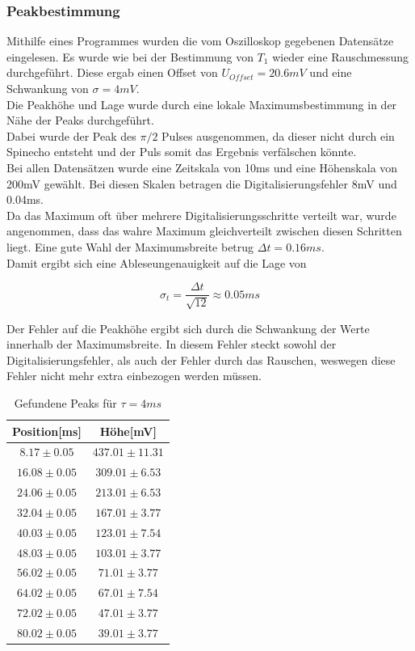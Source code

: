 \documentclass[12pt,a4paper]{article}
\begin{document}
\subsubsection{Peakbestimmung}
Mithilfe eines Programmes wurden die vom Oszilloskop gegebenen Datensätze eingelesen.
Es wurde wie bei der Bestimmung von $T_1$ wieder eine Rauschmessung durchgeführt.
Diese ergab einen Offset von $U_{Offset} = 20.6mV$ und eine Schwankung von $\sigma = 4mV$.\\
Die Peakhöhe und Lage wurde durch eine lokale Maximumsbestimmung in der Nähe der Peaks durchgeführt.\\
Dabei wurde der Peak des $\pi/2$ Pulses ausgenommen, da dieser nicht durch ein Spinecho entsteht und der Puls somit das Ergebnis verfälschen könnte.\\
Bei allen Datensätzen wurde eine Zeitskala von 10ms und eine Höhenskala von 200mV gewählt. Bei diesen Skalen betragen die Digitalisierungsfehler 8mV und 0.04ms.\\
Da das Maximum oft über mehrere Digitalisierungsschritte verteilt war, wurde angenommen, dass das wahre Maximum gleichverteilt zwischen diesen Schritten liegt. Eine gute Wahl der Maximumsbreite betrug $\Delta t = 0.16ms$.\\
Damit ergibt sich eine Ableseungenauigkeit auf die Lage von

\begin{equation*}
\sigma_t = \dfrac{\Delta t}{\sqrt{12}} \approx 0.05ms
\end{equation*}

Der Fehler auf die Peakhöhe ergibt sich durch die Schwankung der Werte innerhalb der Maximumsbreite. In diesem Fehler steckt sowohl der Digitalisierungsfehler, als auch der Fehler durch das Rauschen, weswegen diese Fehler nicht mehr extra einbezogen werden müssen.

\begin{table}
\centering
\begin{tabular}{|c|c|}
\hline 
Position[ms] & Höhe[mV]\\ 
\hline
$ 8.17 \pm 0.05 $ & $ 437.01 \pm 11.31 $ \\
\hline
$ 16.08 \pm 0.05 $ & $ 309.01 \pm 6.53 $ \\
\hline
$ 24.06 \pm 0.05 $ & $ 213.01 \pm 6.53 $ \\
\hline
$ 32.04 \pm 0.05 $ & $ 167.01 \pm 3.77 $ \\
\hline
$ 40.03 \pm 0.05 $ & $ 123.01 \pm 7.54 $ \\
\hline
$ 48.03 \pm 0.05 $ & $ 103.01 \pm 3.77 $ \\
\hline
$ 56.02 \pm 0.05 $ & $ 71.01 \pm 3.77 $ \\
\hline
$ 64.02 \pm 0.05 $ & $ 67.01 \pm 7.54 $ \\
\hline
$ 72.02 \pm 0.05 $ & $ 47.01 \pm 3.77 $ \\
\hline
$ 80.02 \pm 0.05 $ & $ 39.01 \pm 3.77 $ \\
\hline
\end{tabular}
\caption{Gefundene Peaks für $\tau = 4ms$ }
\end{table}
\end{document}
